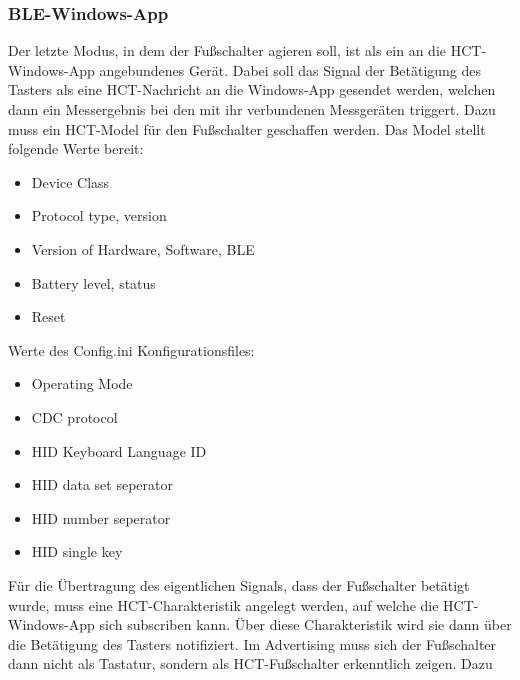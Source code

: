\subsubsection{BLE-Windows-App}
Der letzte Modus, in dem der Fußschalter agieren soll, ist als ein an die HCT-Windows-App angebundenes Gerät. Dabei soll das Signal der Betätigung des Tasters als eine HCT-Nachricht an die Windows-App gesendet werden, welchen dann ein Messergebnis bei den mit ihr verbundenen Messgeräten triggert. Dazu muss ein HCT-Model für den Fußschalter geschaffen werden. Das Model stellt folgende Werte bereit:
\begin{itemize}
	\item Device Class
	\item Protocol type, version 
	\item Version of Hardware, Software, BLE
	\item Battery level, status
	\item Reset 
\end{itemize}

Werte des Config.ini Konfigurationsfiles:
\begin{itemize}
	\item Operating Mode 
	\item CDC protocol 
	\item HID Keyboard Language ID 
	\item HID data set seperator 
	\item HID number seperator
	\item HID single key 
\end{itemize}

Für die Übertragung des eigentlichen Signals, dass der Fußschalter betätigt wurde, muss eine HCT-Charakteristik angelegt werden, auf welche die HCT-Windows-App sich subscriben kann. Über diese Charakteristik wird sie dann über die Betätigung des Tasters notifiziert. Im Advertising muss sich der Fußschalter dann nicht als Tastatur, sondern als HCT-Fußschalter erkenntlich zeigen. Dazu  


